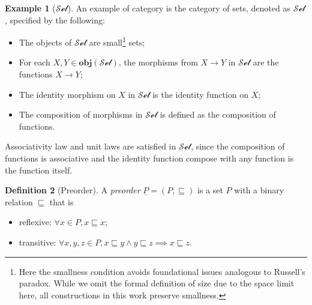 \documentclass[12pt,a4paper]{report}
\theoremstyle{definition}
\newtheorem{definition}{Definition}[chapter]
\newtheorem{example}[definition]{Example}
\begin{document}
        \begin{example}[$\mathcal{Set}$]
            An example of category is the category of sets, denoted as $\mathcal{Set}$, specified by the following:
            \begin{itemize}
                \item 
                    The objects of $\mathcal{Set}$ are small\footnote{Here the smallness condition avoids foundational issues analogous to Russell's paradox. While we omit the formal definition of size due to the space limit here, all constructions in this work preserve smallness.} sets;
                \item
                    For each $X, Y \in \textbf{obj}(\mathcal{Set})$, the morphisms from $X \to Y$ in $\mathcal{Set}$ are the functions $X \to Y$;
                \item
                    The identity morphism on $X$ in $\mathcal{Set}$ is the identity function on $X$;
                \item
                    The composition of morphisms in $\mathcal{Set}$ is defined as the composition of functions.
            \end{itemize}
            Associativity law and unit laws are satisfied in $\mathcal{Set}$, since the composition of functions is associative and the identity function compose with any function is the function itself.
        \end{example}

        \begin{definition}[Preorder]
            A \emph{preorder} $\underline{P} = (P, \sqsubseteq)$ is a set $P$ with a binary relation $\sqsubseteq$ that is
            \begin{itemize}
                \item reflexive: $\forall x \in P, x \sqsubseteq x$;
                \item transitive: $\forall x, y, z \in P, x \sqsubseteq y \land y \sqsubseteq z \implies x \sqsubseteq z$.
            \end{itemize}
        \end{definition}
\end{document}
